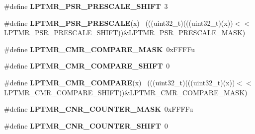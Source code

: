 \begin{DoxyCompactItemize}
\item 
\hypertarget{group___l_p_t_m_r___register___masks_ga7ed76902e13634d0c543ade3ef47525a}{}\#define {\bfseries L\+P\+T\+M\+R\+\_\+\+P\+S\+R\+\_\+\+P\+R\+E\+S\+C\+A\+L\+E\+\_\+\+S\+H\+I\+F\+T}~3\label{group___l_p_t_m_r___register___masks_ga7ed76902e13634d0c543ade3ef47525a}

\item 
\hypertarget{group___l_p_t_m_r___register___masks_gaeb71c6e1dd5200d74099db29087a59e3}{}\#define {\bfseries L\+P\+T\+M\+R\+\_\+\+P\+S\+R\+\_\+\+P\+R\+E\+S\+C\+A\+L\+E}(x)                                    ~(((uint32\+\_\+t)(((uint32\+\_\+t)(x))$<$$<$L\+P\+T\+M\+R\+\_\+\+P\+S\+R\+\_\+\+P\+R\+E\+S\+C\+A\+L\+E\+\_\+\+S\+H\+I\+F\+T))\&L\+P\+T\+M\+R\+\_\+\+P\+S\+R\+\_\+\+P\+R\+E\+S\+C\+A\+L\+E\+\_\+\+M\+A\+S\+K)\label{group___l_p_t_m_r___register___masks_gaeb71c6e1dd5200d74099db29087a59e3}

\item 
\hypertarget{group___l_p_t_m_r___register___masks_ga55cc95c022500b353f1724f2cbfe7a8f}{}\#define {\bfseries L\+P\+T\+M\+R\+\_\+\+C\+M\+R\+\_\+\+C\+O\+M\+P\+A\+R\+E\+\_\+\+M\+A\+S\+K}~0x\+F\+F\+F\+Fu\label{group___l_p_t_m_r___register___masks_ga55cc95c022500b353f1724f2cbfe7a8f}

\item 
\hypertarget{group___l_p_t_m_r___register___masks_gae1a525e22dc8b9c6960ae2e859a64232}{}\#define {\bfseries L\+P\+T\+M\+R\+\_\+\+C\+M\+R\+\_\+\+C\+O\+M\+P\+A\+R\+E\+\_\+\+S\+H\+I\+F\+T}~0\label{group___l_p_t_m_r___register___masks_gae1a525e22dc8b9c6960ae2e859a64232}

\item 
\hypertarget{group___l_p_t_m_r___register___masks_gae5d4cd399ca7bee0964efa18b131a7a9}{}\#define {\bfseries L\+P\+T\+M\+R\+\_\+\+C\+M\+R\+\_\+\+C\+O\+M\+P\+A\+R\+E}(x)                                      ~(((uint32\+\_\+t)(((uint32\+\_\+t)(x))$<$$<$L\+P\+T\+M\+R\+\_\+\+C\+M\+R\+\_\+\+C\+O\+M\+P\+A\+R\+E\+\_\+\+S\+H\+I\+F\+T))\&L\+P\+T\+M\+R\+\_\+\+C\+M\+R\+\_\+\+C\+O\+M\+P\+A\+R\+E\+\_\+\+M\+A\+S\+K)\label{group___l_p_t_m_r___register___masks_gae5d4cd399ca7bee0964efa18b131a7a9}

\item 
\hypertarget{group___l_p_t_m_r___register___masks_ga134708aff0fe3bd31d703e32966c08fc}{}\#define {\bfseries L\+P\+T\+M\+R\+\_\+\+C\+N\+R\+\_\+\+C\+O\+U\+N\+T\+E\+R\+\_\+\+M\+A\+S\+K}~0x\+F\+F\+F\+Fu\label{group___l_p_t_m_r___register___masks_ga134708aff0fe3bd31d703e32966c08fc}

\item 
\hypertarget{group___l_p_t_m_r___register___masks_ga3769a974a3d95250e32bb154fa134c3f}{}\#define {\bfseries L\+P\+T\+M\+R\+\_\+\+C\+N\+R\+\_\+\+C\+O\+U\+N\+T\+E\+R\+\_\+\+S\+H\+I\+F\+T}~0\label{group___l_p_t_m_r___register___masks_ga3769a974a3d95250e32bb154fa134c3f}


\end{DoxyCompactItemize}
